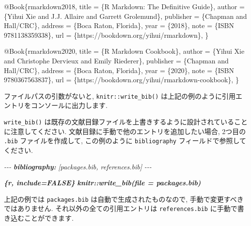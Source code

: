 \documentclass[
  11pt,
  lualatex,
  ja=standard]{bxjsreport}
\newenvironment{Shaded}{\begin{snugshade}}{\end{snugshade}}
\newcommand{\AnnotationTok}[1]{\textcolor[rgb]{0.56,0.35,0.01}{\textbf{\textit{#1}}}}
\newcommand{\CommentTok}[1]{\textcolor[rgb]{0.56,0.35,0.01}{\textit{#1}}}
\newcommand{\DataTypeTok}[1]{\textcolor[rgb]{0.13,0.29,0.53}{#1}}
\newcommand{\InformationTok}[1]{\textcolor[rgb]{0.56,0.35,0.01}{\textbf{\textit{#1}}}}
\newcommand{\NormalTok}[1]{#1}
\newcommand{\OtherTok}[1]{\textcolor[rgb]{0.56,0.35,0.01}{#1}}
\newcommand{\VariableTok}[1]{\textcolor[rgb]{0.00,0.00,0.00}{#1}}
\begin{document}
\begin{Shaded}
\begin{Highlighting}[]
\VariableTok{@Book}\NormalTok{\{}\OtherTok{rmarkdown2018}\NormalTok{,}
  \DataTypeTok{title}\NormalTok{ = \{R Markdown: The Definitive Guide\},}
  \DataTypeTok{author}\NormalTok{ = \{Yihui Xie and J.J. Allaire and Garrett}
\NormalTok{    Grolemund\},}
  \DataTypeTok{publisher}\NormalTok{ = \{Chapman and Hall/CRC\},}
  \DataTypeTok{address}\NormalTok{ = \{Boca Raton, Florida\},}
  \DataTypeTok{year}\NormalTok{ = \{2018\},}
  \DataTypeTok{note}\NormalTok{ = \{ISBN 9781138359338\},}
  \DataTypeTok{url}\NormalTok{ = \{https://bookdown.org/yihui/rmarkdown\},}
\NormalTok{\}}

\VariableTok{@Book}\NormalTok{\{}\OtherTok{rmarkdown2020}\NormalTok{,}
  \DataTypeTok{title}\NormalTok{ = \{R Markdown Cookbook\},}
  \DataTypeTok{author}\NormalTok{ = \{Yihui Xie and Christophe Dervieux and Emily}
\NormalTok{    Riederer\},}
  \DataTypeTok{publisher}\NormalTok{ = \{Chapman and Hall/CRC\},}
  \DataTypeTok{address}\NormalTok{ = \{Boca Raton, Florida\},}
  \DataTypeTok{year}\NormalTok{ = \{2020\},}
  \DataTypeTok{note}\NormalTok{ = \{ISBN 9780367563837\},}
  \DataTypeTok{url}\NormalTok{ = \{https://bookdown.org/yihui/rmarkdown{-}cookbook\},}
\NormalTok{\}}
\end{Highlighting}
\end{Shaded}

ファイルパスの引数がないと, \texttt{knitr::write\_bib()} は上記の例のように引用エントリをコンソールに出力します.

\texttt{write\_bib()} は既存の文献目録ファイルを上書きするように設計されていることに注意してください. 文献目録に手動で他のエントリを追加したい場合, 2つ目の \texttt{.bib} ファイルを作成して, この例のように \texttt{bibliography} フィールドで参照してください.

\begin{Shaded}
\begin{Highlighting}[]
\CommentTok{{-}{-}{-}}
\AnnotationTok{bibliography:}\CommentTok{ [packages.bib, references.bib]}
\CommentTok{{-}{-}{-}}

\InformationTok{\textasciigrave{}\textasciigrave{}\textasciigrave{}\{r, include=FALSE\}}
\InformationTok{knitr::write\_bib(file = \textquotesingle{}packages.bib\textquotesingle{})}
\InformationTok{\textasciigrave{}\textasciigrave{}\textasciigrave{}}
\end{Highlighting}
\end{Shaded}

上記の例では \texttt{packages.bib} は自動で生成されたものなので, 手動で変更すべきではありません. それ以外の全ての引用エントリは \texttt{references.bib} に手動で書き込むことができます.
\end{document}
